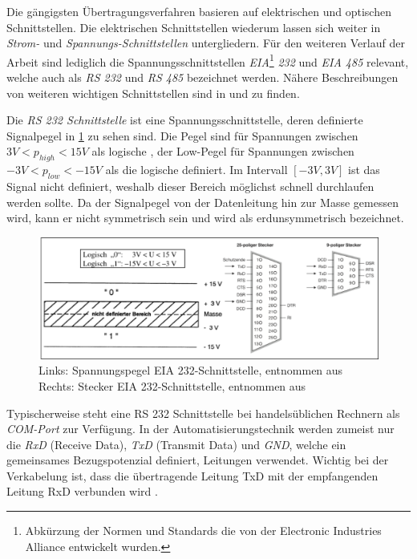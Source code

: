 Die gängigsten Übertragungsverfahren basieren auf elektrischen und optischen Schnittstellen. Die elektrischen Schnittstellen wiederum lassen sich weiter in \textit{Strom-} und \textit{Spannungs-Schnittstellen} untergliedern. Für den weiteren Verlauf der Arbeit sind lediglich die Spannungsschnittstellen \textit{EIA}\footnote{Abkürzung der Normen und Standards die von der Electronic Industries Alliance entwickelt wurden.}\textit{ 232} und \textit{EIA 485} relevant, welche auch als \textit{RS 232} und \textit{RS 485} bezeichnet werden. Nähere Beschreibungen von weiteren wichtigen Schnittstellen sind in \cite[S.~13ff.]{sch08} und \cite[S.~57ff.]{schn06} zu finden.

Die \textit{RS 232 Schnittstelle} ist eine Spannungsschnittstelle, deren definierte Signalpegel in \ref{fig:rs232} zu sehen sind. Die Pegel sind für Spannungen zwischen $3V<p_{high}<15V$ als logische \Gob, der Low-Pegel für Spannungen zwischen $-3V<p_{low}<-15V$ als die logische \Gob definiert. Im Intervall $[-3V,3V]$ ist das Signal nicht definiert, weshalb dieser Bereich möglichst schnell durchlaufen werden sollte. Da der Signalpegel von der Datenleitung hin zur Masse gemessen wird, kann er nicht symmetrisch sein und wird als erdunsymmetrisch bezeichnet. \cite[S.~57f.]{schn06}

\begin{figure}
\centering
\includegraphics[width=\textwidth]{abbildungen/20160314_rs232}
\caption[Spannungspegel und Stecker der EIA 232-Schnittstelle]{Links: Spannungspegel EIA 232-Schnittstelle, entnommen aus \cite[S.~57]{schn06} \newline Rechts: Stecker EIA 232-Schnittstelle, entnommen aus \cite[S.~14]{sch08}}
\label{fig:rs232}
\end{figure}

Typischerweise steht eine RS 232 Schnittstelle bei handelsüblichen Rechnern als \textit{COM-Port} zur Verfügung. In der Automatisierungstechnik werden zumeist nur die \textit{RxD} (Receive Data), \textit{TxD} (Transmit Data) und \textit{GND}, welche ein gemeinsames Bezugspotenzial definiert, Leitungen verwendet. Wichtig bei der Verkabelung ist, dass die übertragende Leitung TxD mit der empfangenden Leitung RxD verbunden wird \cite[S.~14f.]{sch08}.

